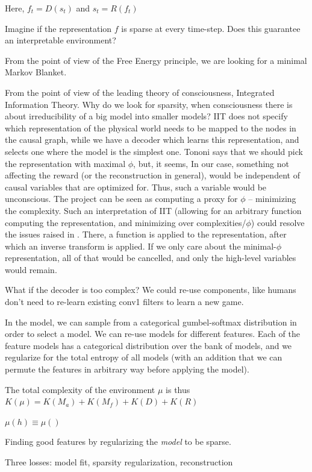 \documentclass[a4paper,11pt,oneside]{report}
\begin{document}
Here, $f_t=D(s_t)$ and $s_t=R(f_t)$

Imagine if the representation $f$ is sparse at every time-step. Does this guarantee an interpretable environment?

From the point of view of the Free Energy principle, we are looking for a minimal Markov Blanket.

From the point of view of the leading theory of consciousness, Integrated Information Theory. Why do we look for sparsity, when consciousness there is about irreducibility of a big model into smaller models? IIT does not specify which representation of the physical world needs to be mapped to the nodes in the causal graph, while we have a decoder which learns this representation, and selects one where the model is the simplest one. Tononi says that we should pick the representation with maximal $\phi$, but, it seems, In our case, something not affecting the reward (or the reconstruction in general), would be independent of causal variables that are optimized for. Thus, such a variable would be unconscious. The project can be seen as computing a proxy for $\phi$ -- minimizing the complexity. Such an interpretation of IIT (allowing for an arbitrary function computing the representation, and minimizing over complexities/$\phi$) could resolve the issues raised in \cite{doerig2019unfolding}. There, a function is applied to the representation, after which an inverse transform is applied. If we only care about the minimal-$\phi$ representation, all of that would be cancelled, and only the high-level variables would remain.


What if the decoder is too complex? We could re-use components, like humans don't need to re-learn existing conv1 filters to learn a new game.

In the model, we can sample from a categorical gumbel-softmax distribution in order to select a model. We can re-use models for different features. Each of the feature models has a categorical distribution over the bank of models, and we regularize for the total entropy of all models (with an addition that we can permute the features in arbitrary way before applying the model).


The total complexity of the environment $\mu$ is thus $K(\mu)=K(M_a)+K(M_f)+K(D)+K(R)$


$\mu(h)\equiv \mu()$

Finding good features by regularizing the {\em model} to be sparse.

Three losses: model fit, sparsity regularization, reconstruction
\end{document}
